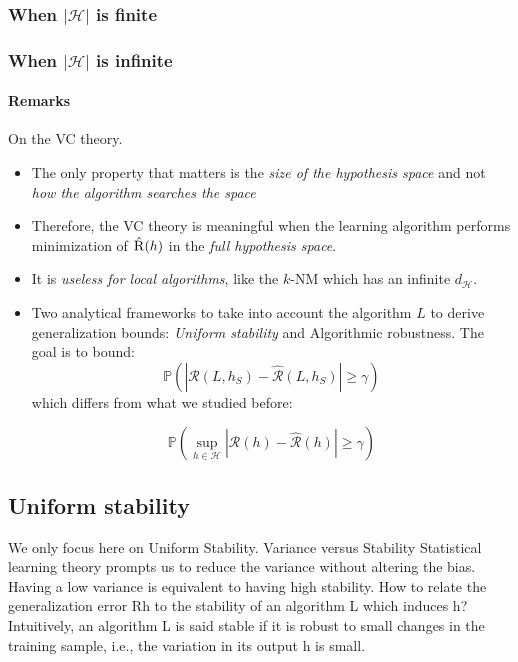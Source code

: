\documentclass{article}
\begin{document}
\subsubsection{When $|\mathcal{H}|$ is finite}


\subsubsection{When $|\mathcal{H}|$ is infinite}


\paragraph{Remarks}
On the VC theory.
\begin{itemize}
\item The only property that matters is the \emph{size of the hypothesis space} and not \emph{how the algorithm searches the space}

\item Therefore, the VC theory is meaningful when the learning algorithm performs minimization of $\hat{\textsc{R}}(h)$ in the \emph{full hypothesis space}.
\item It is \emph{useless for local algorithms}, like the $k$-NM which has an infinite $d_{\mathcal{H}}$.

\item Two analytical frameworks to take into account the algorithm $L$ to derive generalization bounds: \emph{Uniform stability} and {Algorithmic robustness}. The goal is to bound:
\[ \mathbb{P} (|\mathcal{R}(L, h_S ) - \hat{\mathcal{R}}(L, h_S)| \geq \gamma) \]
which differs from what we studied before:

\[ \mathbb{P} ( \sup_{h\in \mathcal{H}}|\mathcal{R}(h) - \hat{\mathcal{R}}(h)| \geq \gamma) \]
\end{itemize}

\subsection{Uniform stability}
We only focus here on Uniform Stability.
Variance versus Stability
Statistical learning theory prompts us to reduce the variance
without altering the bias.
Having a low variance is equivalent to having high stability.
How to relate the generalization error Rh to the stability of an
algorithm L which induces h?
Intuitively, an algorithm L is said stable if it is robust to small changes in
the training sample, i.e., the variation in its output h is small.
\end{document}
